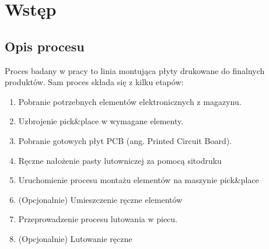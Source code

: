 \chapter{Wstęp}

\section{Opis procesu}

Proces badany w pracy to linia montująca płyty drukowane do finalnych produktów. Sam proces składa się z kilku etapów:
\begin{enumerate}
	\item Pobranie potrzebnych elementów elektronicznych z magazynu.
	\item Uzbrojenie pick\&place w wymagane elementy.
	\item Pobranie gotowych płyt PCB (ang. Printed Circuit Board).
	\item Ręczne nałożenie pasty lutowniczej za pomocą sitodruku
	\item Uruchomienie procesu montażu elementów na maszynie pick\&place
	\item (Opcjonalnie) Umieszczenie ręczne elementów
	\item Przeprowadzenie procesu lutowania w piecu.
	\item (Opcjonalnie) Lutowanie ręczne
\end{enumerate}
